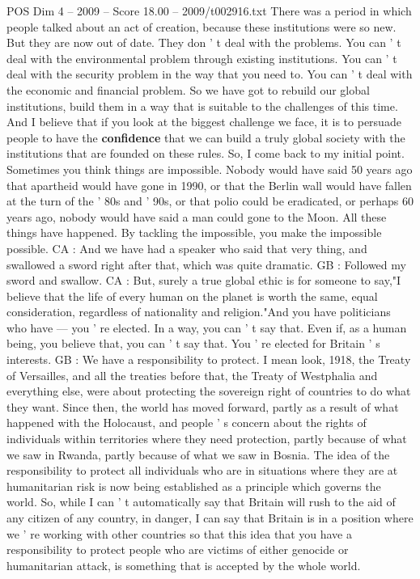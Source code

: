 \begin{textsample}{POS Dim 4 – 2009 – Score 18.00 – 2009/t002916.txt}
There was a period in which people talked about an act of creation, because these institutions were so new.
But they are now out of date.
They don ' t deal with the problems.
You can ' t deal with the environmental problem through existing institutions.
You can ' t deal with the security problem in the way that you need to.
You can ' t deal with the economic and financial problem.
So we have got to rebuild our global institutions, build them in a way that is suitable to the challenges of this time.
And I believe that if you look at the biggest challenge we face, it is to persuade people to have the \textbf{confidence} that we can build a truly global society with the institutions that are founded on these rules.
So, I come back to my initial point.
Sometimes you think things are impossible.
Nobody would have said 50 years ago that apartheid would have gone in 1990, or that the Berlin wall would have fallen at the turn of the ' 80s and ' 90s, or that polio could be eradicated, or perhaps 60 years ago, nobody would have said a man could gone to the Moon.
All these things have happened.
By tackling the impossible, you make the impossible possible.
CA : And we have had a speaker who said that very thing, and swallowed a sword right after that, which was quite dramatic.
GB : Followed my sword and swallow.
CA : But, surely a true global ethic is for someone to say,"I believe that the life of every human on the planet is worth the same, equal consideration, regardless of nationality and religion."And you have politicians who have — you ' re elected.
In a way, you can ' t say that.
Even if, as a human being, you believe that, you can ' t say that.
You ' re elected for Britain ' s interests.
GB : We have a responsibility to protect.
I mean look, 1918, the Treaty of Versailles, and all the treaties before that, the Treaty of Westphalia and everything else, were about protecting the sovereign right of countries to do what they want.
Since then, the world has moved forward, partly as a result of what happened with the Holocaust, and people ' s concern about the rights of individuals within territories where they need protection, partly because of what we saw in Rwanda, partly because of what we saw in Bosnia.
The idea of the responsibility to protect all individuals who are in situations where they are at humanitarian risk is now being established as a principle which governs the world.
So, while I can ' t automatically say that Britain will rush to the aid of any citizen of any country, in danger, I can say that Britain is in a position where we ' re working with other countries so that this idea that you have a responsibility to protect people who are victims of either genocide or humanitarian attack, is something that is accepted by the whole world.

\end{textsample}
